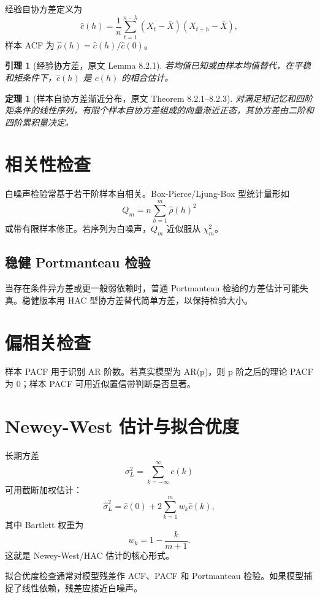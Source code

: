 \documentclass[11pt,a4paper,openany]{ctexbook}
\newtheorem{theorem}{定理}[section]
\newtheorem{lemma}{引理}[section]
\begin{document}
经验自协方差定义为
\[
  \hat c(h)=\frac1n\sum_{t=1}^{n-h}(X_t-\bar X)(X_{t+h}-\bar X),
\]
样本 ACF 为 \(\hat\rho(h)=\hat c(h)/\hat c(0)\)。

\begin{lemma}[经验协方差，原文 Lemma 8.2.1]
若均值已知或由样本均值替代，在平稳和矩条件下，\(\hat c(h)\) 是 \(c(h)\) 的相合估计。
\end{lemma}

\begin{theorem}[样本自协方差渐近分布，原文 Theorem 8.2.1--8.2.3]
对满足短记忆和四阶矩条件的线性序列，有限个样本自协方差组成的向量渐近正态，其协方差由二阶和四阶累积量决定。
\end{theorem}

\section{相关性检查}

白噪声检验常基于若干阶样本自相关。Box-Pierce/Ljung-Box 型统计量形如
\[
  Q_m=n\sum_{h=1}^m\hat\rho(h)^2
\]
或带有限样本修正。若序列为白噪声，\(Q_m\) 近似服从 \(\chi_m^2\)。

\subsection{稳健 Portmanteau 检验}

当存在条件异方差或更一般弱依赖时，普通 Portmanteau 检验的方差估计可能失真。稳健版本用 HAC 型协方差替代简单方差，以保持检验大小。

\section{偏相关检查}

样本 PACF 用于识别 AR 阶数。若真实模型为 AR(p)，则 p 阶之后的理论 PACF 为 0；样本 PACF 可用近似置信带判断是否显著。

\section{Newey-West 估计与拟合优度}

长期方差
\[
  \sigma_L^2=\sum_{k=-\infty}^{\infty}c(k)
\]
可用截断加权估计：
\[
  \hat\sigma_L^2=\hat c(0)+2\sum_{k=1}^{m}w_k\hat c(k),
\]
其中 Bartlett 权重为
\[
  w_k=1-\frac{k}{m+1}.
\]
这就是 Newey-West/HAC 估计的核心形式。

拟合优度检查通常对模型残差作 ACF、PACF 和 Portmanteau 检验。如果模型捕捉了线性依赖，残差应接近白噪声。
\end{document}
